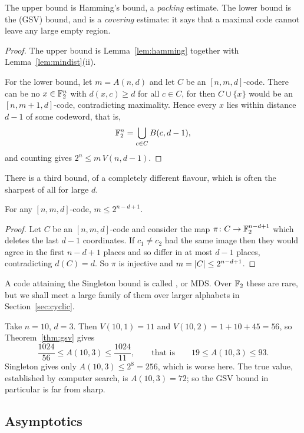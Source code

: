\documentclass[a4paper]{scrartcl}
\begin{document}
The upper bound is Hamming's bound, a \emph{packing} estimate. The lower bound is the  (GSV) bound, and is a \emph{covering} estimate: it says that a maximal code cannot leave any large empty region.

\begin{proof}
	The upper bound is Lemma~\ref{lem:hamming} together with Lemma~\ref{lem:mindist}(ii).

	For the lower bound, let $m = A(n,d)$ and let $C$ be an $[n,m,d]$-code. There can be no $x \in \mathbb{F}_2^n$ with $d(x,c) \ge d$ for all $c \in C$, for then $C \cup \{x\}$ would be an $[n,m+1,d]$-code, contradicting maximality. Hence every $x$ lies within distance $d-1$ of some codeword, that is,
	$$\mathbb{F}_2^n = \bigcup_{c \in C} B(c,d-1),$$
	and counting gives $2^n \le m\,V(n,d-1)$.
\end{proof}

There is a third bound, of a completely different flavour, which is often the sharpest of all for large $d$.

\begin{theorem}\label{thm:singleton}
	For any $[n,m,d]$-code, $m \le 2^{n-d+1}$.
\end{theorem}

\begin{proof}
	Let $C$ be an $[n,m,d]$-code and consider the map $\pi \colon C \to \mathbb{F}_2^{n-d+1}$ which deletes the last $d-1$ coordinates. If $c_1 \ne c_2$ had the same image then they would agree in the first $n-d+1$ places and so differ in at most $d-1$ places, contradicting $d(C) = d$. So $\pi$ is injective and $m = \lvert C\rvert \le 2^{n-d+1}$.
\end{proof}

A code attaining the Singleton bound is called , or MDS. Over $\mathbb{F}_2$ these are rare, but we shall meet a large family of them over larger alphabets in Section~\ref{sec:cyclic}.

\begin{example}
	Take $n = 10$, $d = 3$. Then $V(10,1) = 11$ and $V(10,2) = 1 + 10 + 45 = 56$, so Theorem~\ref{thm:gsv} gives
	$$\frac{1024}{56} \le A(10,3) \le \frac{1024}{11}, \qquad \text{that is} \qquad 19 \le A(10,3) \le 93.$$
	Singleton gives only $A(10,3) \le 2^8 = 256$, which is worse here. The true value, established by computer search, is $A(10,3) = 72$; so the GSV bound in particular is far from sharp.
\end{example}

\subsection{Asymptotics}
\end{document}

